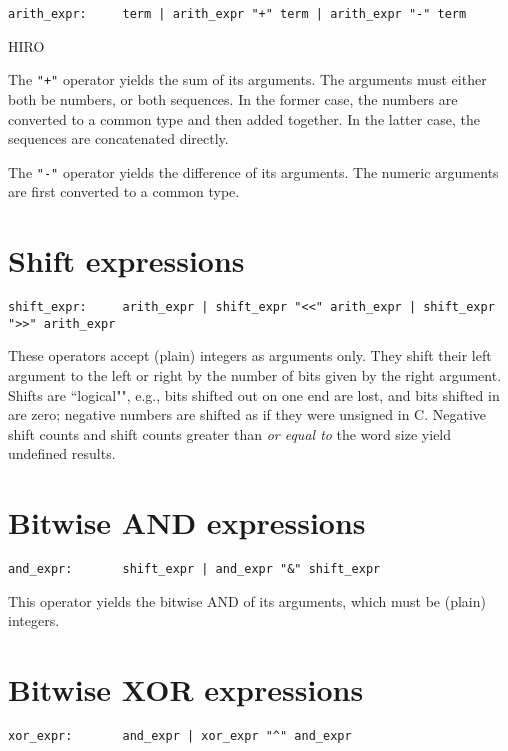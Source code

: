 \begin{verbatim}
arith_expr:     term | arith_expr "+" term | arith_expr "-" term
\end{verbatim}

HIRO

The \verb|"+"| operator yields the sum of its arguments.  The
arguments must either both be numbers, or both sequences.  In the
former case, the numbers are converted to a common type and then added
together.  In the latter case, the sequences are concatenated
directly.

The \verb|"-"| operator yields the difference of its arguments.
The numeric arguments are first converted to a common type.

\section{Shift expressions}

\begin{verbatim}
shift_expr:     arith_expr | shift_expr "<<" arith_expr | shift_expr ">>" arith_expr
\end{verbatim}

These operators accept (plain) integers as arguments only.
They shift their left argument to the left or right by the number of bits
given by the right argument.  Shifts are ``logical"", e.g., bits shifted
out on one end are lost, and bits shifted in are zero;
negative numbers are shifted as if they were unsigned in C.
Negative shift counts and shift counts greater than {\em or equal to}
the word size yield undefined results.

\section{Bitwise AND expressions}

\begin{verbatim}
and_expr:       shift_expr | and_expr "&" shift_expr
\end{verbatim}

This operator yields the bitwise AND of its arguments,
which must be (plain) integers.

\section{Bitwise XOR expressions}

\begin{verbatim}
xor_expr:       and_expr | xor_expr "^" and_expr
\end{verbatim}

